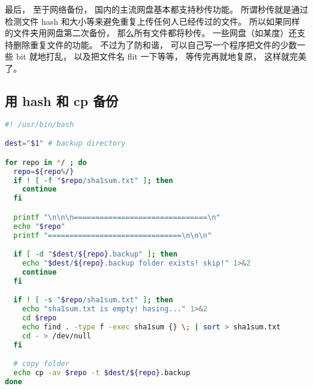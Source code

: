 最后， 至于网络备份， 国内的主流网盘基本都支持秒传功能。 所谓秒传就是通过检测文件 hash 和大小等来避免重复上传任何人已经传过的文件。 所以如果同样的文件夹用网盘第二次备份， 那么所有文件都将秒传。 一些网盘（如某度）还支持删除重复文件的功能。 不过为了防和谐， 可以自己写一个程序把文件的少数一些 bit 就地打乱， 以及把文件名 flit 一下等等， 等传完再就地复原， 这样就完美了。


\subsection{用 hash 和 cp 备份}

\begin{lstlisting}[language=bash]
#! /usr/bin/bash

dest="$1" # backup directory

for repo in */ ; do
  repo=${repo%/}
  if ! [ -f "$repo/sha1sum.txt" ]; then
    continue
  fi

  printf "\n\n\n===============================\n"
  echo "$repo"
  printf "===============================\n\n\n"

  if [ -d "$dest/${repo}.backup" ]; then
    echo "$dest/${repo}.backup folder exists! skip!" 1>&2
    continue
  fi

  if ! [ -s "$repo/sha1sum.txt" ]; then
    echo "sha1sum.txt is empty! hasing..." 1>&2
    cd $repo
    echo find . -type f -exec sha1sum {} \; | sort > sha1sum.txt
    cd - > /dev/null
  fi

  # copy folder
  echo cp -av $repo -t $dest/${repo}.backup
done
\end{lstlisting}
